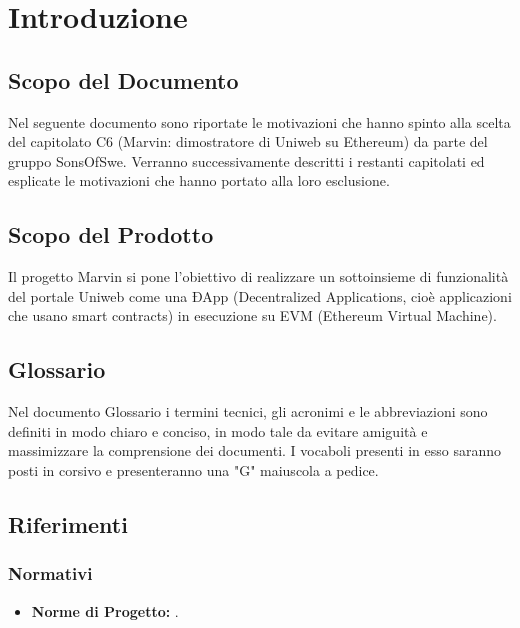 \section{Introduzione}
\subsection{Scopo del Documento}
	Nel seguente documento sono riportate le motivazioni che hanno spinto alla scelta del capitolato C6 (Marvin: dimostratore di Uniweb su Ethereum) da parte del gruppo SonsOfSwe. Verranno successivamente descritti i restanti capitolati ed esplicate le motivazioni che hanno portato alla loro esclusione.
	
\subsection{Scopo del Prodotto}
	Il progetto Marvin si pone l'obiettivo di realizzare un sottoinsieme di funzionalità del portale Uniweb come una ÐApp (Decentralized Applications, cioè applicazioni che usano smart contracts) in esecuzione su EVM (Ethereum Virtual Machine).
	
\subsection{Glossario}
	Nel documento Glossario i termini tecnici, gli acronimi e le abbreviazioni sono definiti in modo chiaro e conciso, in modo tale da evitare amiguità e massimizzare la comprensione dei documenti.
	\newline \newline I vocaboli presenti in esso saranno posti in corsivo e presenteranno una "G" maiuscola a pedice.
	
\subsection{Riferimenti}
	\subsubsection{Normativi}
		\begin{itemize}
			\item \textbf{Norme di Progetto: }.
		\end{itemize}
	
